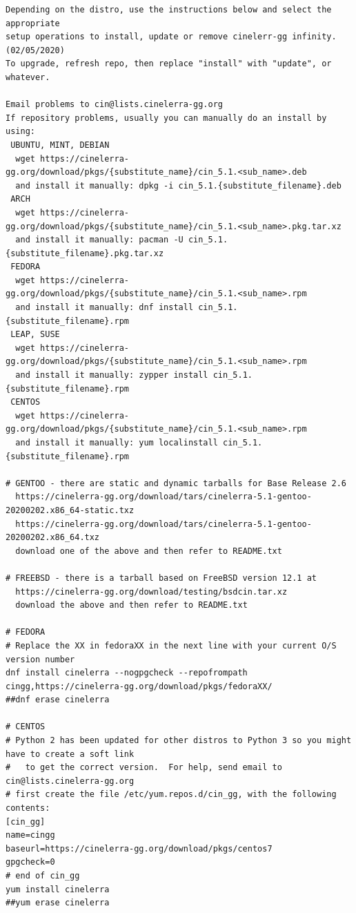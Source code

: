 \begin{lstlisting}[numbers=none]
Depending on the distro, use the instructions below and select the appropriate 
setup operations to install, update or remove cinelerr-gg infinity.  (02/05/2020)
To upgrade, refresh repo, then replace "install" with "update", or whatever.

Email problems to cin@lists.cinelerra-gg.org
If repository problems, usually you can manually do an install by using:
 UBUNTU, MINT, DEBIAN
  wget https://cinelerra-gg.org/download/pkgs/{substitute_name}/cin_5.1.<sub_name>.deb
  and install it manually: dpkg -i cin_5.1.{substitute_filename}.deb
 ARCH
  wget https://cinelerra-gg.org/download/pkgs/{substitute_name}/cin_5.1.<sub_name>.pkg.tar.xz
  and install it manually: pacman -U cin_5.1.{substitute_filename}.pkg.tar.xz
 FEDORA
  wget https://cinelerra-gg.org/download/pkgs/{substitute_name}/cin_5.1.<sub_name>.rpm
  and install it manually: dnf install cin_5.1.{substitute_filename}.rpm
 LEAP, SUSE
  wget https://cinelerra-gg.org/download/pkgs/{substitute_name}/cin_5.1.<sub_name>.rpm
  and install it manually: zypper install cin_5.1.{substitute_filename}.rpm
 CENTOS
  wget https://cinelerra-gg.org/download/pkgs/{substitute_name}/cin_5.1.<sub_name>.rpm
  and install it manually: yum localinstall cin_5.1.{substitute_filename}.rpm

# GENTOO - there are static and dynamic tarballs for Base Release 2.6
  https://cinelerra-gg.org/download/tars/cinelerra-5.1-gentoo-20200202.x86_64-static.txz
  https://cinelerra-gg.org/download/tars/cinelerra-5.1-gentoo-20200202.x86_64.txz
  download one of the above and then refer to README.txt

# FREEBSD - there is a tarball based on FreeBSD version 12.1 at
  https://cinelerra-gg.org/download/testing/bsdcin.tar.xz
  download the above and then refer to README.txt

# FEDORA
# Replace the XX in fedoraXX in the next line with your current O/S version number
dnf install cinelerra --nogpgcheck --repofrompath cingg,https://cinelerra-gg.org/download/pkgs/fedoraXX/
##dnf erase cinelerra

# CENTOS
# Python 2 has been updated for other distros to Python 3 so you might have to create a soft link
#   to get the correct version.  For help, send email to cin@lists.cinelerra-gg.org
# first create the file /etc/yum.repos.d/cin_gg, with the following contents:
[cin_gg]
name=cingg
baseurl=https://cinelerra-gg.org/download/pkgs/centos7
gpgcheck=0
# end of cin_gg
yum install cinelerra
##yum erase cinelerra


\end{lstlisting}
